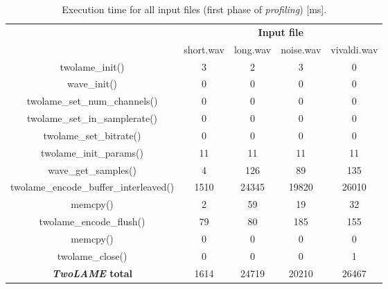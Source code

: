 \begin{table}[H]
    \centering
    \begin{tabular}{c|c|c|c|c|}
    \cline{2-5}
    \multicolumn{1}{c|}{}  & \multicolumn{4}{c|}{\textbf{Input file}} \\
    \cline{2-5}
     & short.wav & long.wav & noise.wav & vivaldi.wav \\
    \hline
    \multicolumn{1}{|c|}{twolame\_init()}  & 3 & 2 & 3 & 0 \\ 
    \hline
    \multicolumn{1}{|c|}{wave\_init()}  & 0 & 0 & 0 & 0 \\ 
    \hline
    \multicolumn{1}{|c|}{twolame\_set\_num\_channels()}   & 0 & 0 & 0 & 0 \\ 
    \hline
    \multicolumn{1}{|c|}{twolame\_set\_in\_samplerate()}   & 0 & 0 & 0 & 0 \\ 
    \hline
    \multicolumn{1}{|c|}{twolame\_set\_bitrate()}   & 0 & 0 & 0 & 0 \\ 
    \hline
    \multicolumn{1}{|c|}{twolame\_init\_params()}   & 11 & 11 & 11 & 11 \\ 
    \hline
    \multicolumn{1}{|c|}{wave\_get\_samples()}   & 4 & 126 & 89 & 135 \\ 
    \hline
    \multicolumn{1}{|c|}{twolame\_encode\_buffer\_interleaved()}   & 1510 & 24345 & 19820 & 26010 \\ 
    \hline
    \multicolumn{1}{|c|}{memcpy()}  & 2 & 59 & 19 & 32 \\ 
    \hline
    \multicolumn{1}{|c|}{twolame\_encode\_flush()}   & 79 & 80 & 185 & 155 \\ 
    \hline
    \multicolumn{1}{|c|}{memcpy()}  & 0 & 0 & 0 & 0 \\ 
    \hline
    \multicolumn{1}{|c|}{twolame\_close()}   & 0 & 0 & 0 & 1 \\ 
    \hline
    \multicolumn{1}{|c|}{\textbf{\textit{TwoLAME} total}}  & 1614 & 24719 & 20210 & 26467 \\ 
    \hline
    \end{tabular}
    \caption{Execution time for all input files (first phase of \textit{profiling}) [ms].}
    \label{profiling1}
\end{table}

\vspace{1cm}


